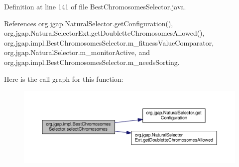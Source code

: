 Definition at line 141 of file Best\-Chromosomes\-Selector.\-java.



References org.\-jgap.\-Natural\-Selector.\-get\-Configuration(), org.\-jgap.\-Natural\-Selector\-Ext.\-get\-Doublette\-Chromosomes\-Allowed(), org.\-jgap.\-impl.\-Best\-Chromosomes\-Selector.\-m\-\_\-fitness\-Value\-Comparator, org.\-jgap.\-Natural\-Selector.\-m\-\_\-monitor\-Active, and org.\-jgap.\-impl.\-Best\-Chromosomes\-Selector.\-m\-\_\-needs\-Sorting.



Here is the call graph for this function\-:
\nopagebreak
\begin{figure}[H]
\begin{center}
\leavevmode
\includegraphics[width=350pt]{classorg_1_1jgap_1_1impl_1_1_best_chromosomes_selector_afa8c26dbb642fa1809cd89cb9b7e0d43_cgraph}
\end{center}
\end{figure}


